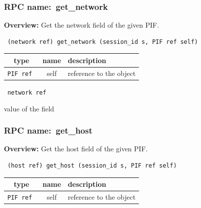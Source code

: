 \vspace{0.3cm}
\vspace{0.3cm}
\vspace{0.3cm}
\subsubsection{RPC name:~get\_network}

{\bf Overview:} 
Get the network field of the given PIF.

\begin{verbatim} (network ref) get_network (session_id s, PIF ref self)\end{verbatim}



 
\vspace{0.3cm}
\begin{tabular}{|c|c|p{7cm}|}
 \hline
{\bf type} & {\bf name} & {\bf description} \\ \hline
{\tt PIF ref } & self & reference to the object \\ \hline 

\end{tabular}

\vspace{0.3cm}

{\tt 
network ref
}


value of the field
\vspace{0.3cm}
\vspace{0.3cm}
\vspace{0.3cm}
\subsubsection{RPC name:~get\_host}

{\bf Overview:} 
Get the host field of the given PIF.

\begin{verbatim} (host ref) get_host (session_id s, PIF ref self)\end{verbatim}



 
\vspace{0.3cm}
\begin{tabular}{|c|c|p{7cm}|}
 \hline
{\bf type} & {\bf name} & {\bf description} \\ \hline
{\tt PIF ref } & self & reference to the object \\ \hline 

\end{tabular}

